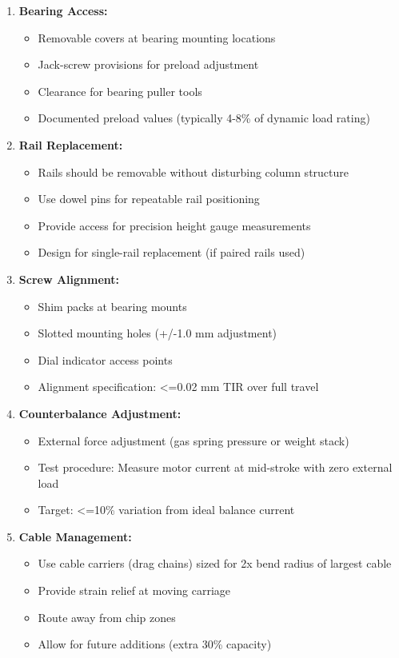 \documentclass[
]{article}
\providecommand{\tightlist}{%
  \setlength{\itemsep}{0pt}\setlength{\parskip}{0pt}}
\begin{document}
\begin{enumerate}
\def\labelenumi{\arabic{enumi}.}
\tightlist
\item
  \textbf{Bearing Access:}

  \begin{itemize}
  \tightlist
  \item
    Removable covers at bearing mounting locations
  \item
    Jack-screw provisions for preload adjustment
  \item
    Clearance for bearing puller tools
  \item
    Documented preload values (typically 4-8\% of dynamic load rating)
  \end{itemize}
\item
  \textbf{Rail Replacement:}

  \begin{itemize}
  \tightlist
  \item
    Rails should be removable without disturbing column structure
  \item
    Use dowel pins for repeatable rail positioning
  \item
    Provide access for precision height gauge measurements
  \item
    Design for single-rail replacement (if paired rails used)
  \end{itemize}
\item
  \textbf{Screw Alignment:}

  \begin{itemize}
  \tightlist
  \item
    Shim packs at bearing mounts
  \item
    Slotted mounting holes (+/-1.0 mm adjustment)
  \item
    Dial indicator access points
  \item
    Alignment specification: \textless=0.02 mm TIR over full travel
  \end{itemize}
\item
  \textbf{Counterbalance Adjustment:}

  \begin{itemize}
  \tightlist
  \item
    External force adjustment (gas spring pressure or weight stack)
  \item
    Test procedure: Measure motor current at mid-stroke with zero
    external load
  \item
    Target: \textless=10\% variation from ideal balance current
  \end{itemize}
\item
  \textbf{Cable Management:}

  \begin{itemize}
  \tightlist
  \item
    Use cable carriers (drag chains) sized for 2x bend radius of largest
    cable
  \item
    Provide strain relief at moving carriage
  \item
    Route away from chip zones
  \item
    Allow for future additions (extra 30\% capacity)
  \end{itemize}
\end{enumerate}
\end{document}
